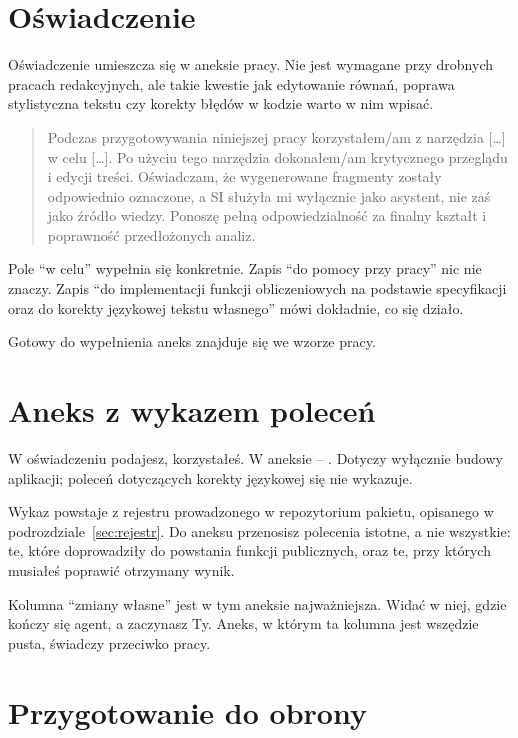 \section{Oświadczenie}

Oświadczenie umieszcza się w aneksie pracy. Nie jest wymagane przy drobnych pracach redakcyjnych, ale takie kwestie jak edytowanie równań, poprawa stylistyczna tekstu czy korekty błędów w kodzie warto w nim wpisać.

\begin{quote}
Podczas przygotowywania niniejszej pracy korzystałem/am z narzędzia [\ldots] w celu [\ldots]. Po użyciu tego narzędzia dokonałem/am krytycznego przeglądu i edycji treści. Oświadczam, że wygenerowane fragmenty zostały odpowiednio oznaczone, a SI służyła mi wyłącznie jako asystent, nie zaś jako źródło wiedzy. Ponoszę pełną odpowiedzialność za finalny kształt i poprawność przedłożonych analiz.
\end{quote}

Pole \enquote{w celu} wypełnia się konkretnie. Zapis \enquote{do pomocy przy pracy} nic nie znaczy. Zapis \enquote{do implementacji funkcji obliczeniowych na podstawie specyfikacji oraz do korekty językowej tekstu własnego} mówi dokładnie, co się działo.

Gotowy do wypełnienia aneks znajduje się we wzorze pracy.

\section{Aneks z wykazem poleceń}

W oświadczeniu podajesz,  korzystałeś. W aneksie -- . Dotyczy wyłącznie budowy aplikacji; poleceń dotyczących korekty językowej się nie wykazuje.

Wykaz powstaje z rejestru prowadzonego w repozytorium pakietu, opisanego w podrozdziale~\ref{sec:rejestr}. Do aneksu przenosisz polecenia istotne, a nie wszystkie: te, które doprowadziły do powstania funkcji publicznych, oraz te, przy których musiałeś poprawić otrzymany wynik.

Kolumna \enquote{zmiany własne} jest w tym aneksie najważniejsza. Widać w niej, gdzie kończy się agent, a zaczynasz Ty. Aneks, w którym ta kolumna jest wszędzie pusta, świadczy przeciwko pracy.

\section{Przygotowanie do obrony}

